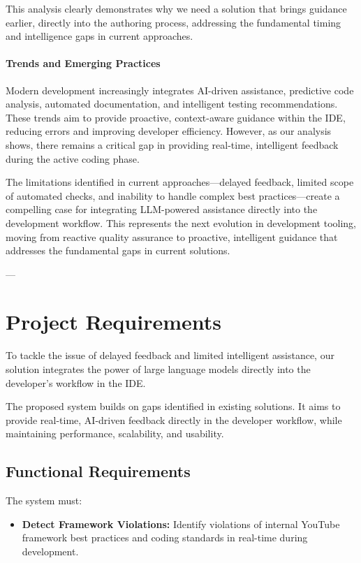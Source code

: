 \begin{spacing}{1.2}
This analysis clearly demonstrates why we need a solution that brings guidance earlier, directly into the authoring process, addressing the fundamental timing and intelligence gaps in current approaches.




\paragraph{Trends and Emerging Practices}
Modern development increasingly integrates AI-driven assistance, predictive code analysis, automated documentation, and intelligent testing recommendations. These trends aim to provide proactive, context-aware guidance within the IDE, reducing errors and improving developer efficiency. However, as our analysis shows, there remains a critical gap in providing real-time, intelligent feedback during the active coding phase.

The limitations identified in current approaches—delayed feedback, limited scope of automated checks, and inability to handle complex best practices—create a compelling case for integrating LLM-powered assistance directly into the development workflow. This represents the next evolution in development tooling, moving from reactive quality assurance to proactive, intelligent guidance that addresses the fundamental gaps in current solutions.

---

\section{Project Requirements}

To tackle the issue of delayed feedback and limited intelligent assistance, our solution integrates the power of large language models directly into the developer's workflow in the IDE.

The proposed system builds on gaps identified in existing solutions. It aims to provide real-time, AI-driven feedback directly in the developer workflow, while maintaining performance, scalability, and usability.

\subsection{Functional Requirements}
The system must:
\begin{itemize}
    \item \textbf{Detect Framework Violations:} Identify violations of internal YouTube framework best practices and coding standards in real-time during development.
    

\end{itemize}
\end{spacing}
